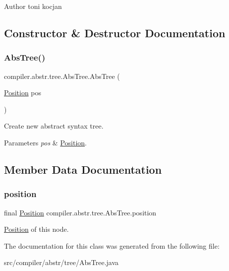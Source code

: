 \begin{DoxyAuthor}{Author}
toni kocjan 
\end{DoxyAuthor}


\subsection{Constructor \& Destructor Documentation}
\mbox{\label{classcompiler_1_1abstr_1_1tree_1_1_abs_tree_a4685afe81da918ece73cdcac477c810c}} 
\subsubsection{\texorpdfstring{Abs\+Tree()}{AbsTree()}}
{\footnotesize\ttfamily compiler.\+abstr.\+tree.\+Abs\+Tree.\+Abs\+Tree (\begin{DoxyParamCaption}\item[{\hyperlink{classcompiler_1_1_position}{Position}}]{pos }\end{DoxyParamCaption})}

Create new abstract syntax tree.


\begin{DoxyParams}{Parameters}
{\em pos} & \hyperlink{classcompiler_1_1_position}{Position}. \\
\hline
\end{DoxyParams}


\subsection{Member Data Documentation}
\mbox{\label{classcompiler_1_1abstr_1_1tree_1_1_abs_tree_a127a686d3a3f9ba470f36c6b3336caea}} 
\subsubsection{\texorpdfstring{position}{position}}
{\footnotesize\ttfamily final \hyperlink{classcompiler_1_1_position}{Position} compiler.\+abstr.\+tree.\+Abs\+Tree.\+position}

\hyperlink{classcompiler_1_1_position}{Position} of this node. 

The documentation for this class was generated from the following file\+:\begin{DoxyCompactItemize}
\item 
src/compiler/abstr/tree/Abs\+Tree.\+java\end{DoxyCompactItemize}
